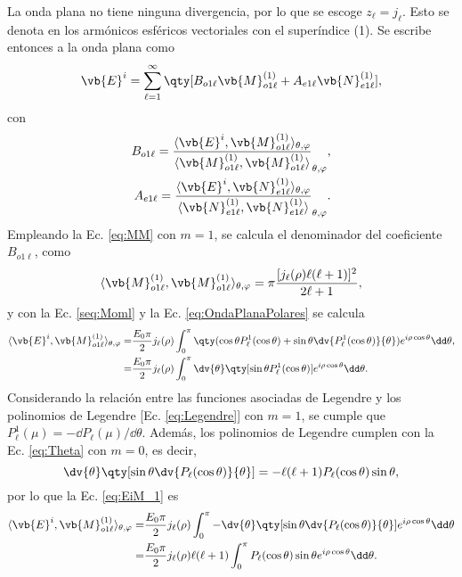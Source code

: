La onda plana no tiene ninguna divergencia, por lo que se escoge $z_\ell = j_\ell$. Esto se denota en los armónicos esféricos vectoriales con el superíndice (1). Se escribe entonces a la onda plana como
	\begin{equation}
	\vb{E}^i = \sum_{\ell=1}^\infty \qty[B_{o1\ell}\vb{M}_{o1\ell}^{(1)} + A_{e1\ell}\vb{N}_{e1\ell}^{(1)}],
	\end{equation}
con
%
	\begin{align}
	B_{o1\ell} = \frac{\langle \vb{E}^i, \vb{M}_{o1\ell}^{(1)}  \rangle_{\theta,\varphi}}
						{\langle \vb{M}_{o1\ell}^{(1)} ,\vb{M}_{o1\ell}^{(1)} \rangle}_{\theta,\varphi},\notag\\
	A_{e1\ell} = \frac{\langle \vb{E}^i, \vb{N}_{e1\ell}^{(1)} \rangle_{\theta,\varphi}}
						{\langle \vb{N}_{e1\ell}^{(1)},\vb{N}_{e1\ell}^{(1)} \rangle}_{\theta,\varphi}						.
	\end{align}
%
Empleando la Ec. \eqref{eq:MM} con $m=1$, se calcula el denominador del coeficiente $B_{o1\ell}$, como
	\begin{equation}
			\langle \vb{M}_{o1\ell}^{(1)} ,\vb{M}_{o1\ell}^{(1)} \rangle_{\theta,\varphi} = \pi \frac{[j_\ell(\rho) \ell(\ell+1)]^2}{2\ell+1},
			\label{eq:MMm=1}
	\end{equation}
y con la Ec. \eqref{seq:Moml} y la Ec. \eqref{eq:OndaPlanaPolares} se calcula
	\begin{align}
		\langle \vb{E}^i, \vb{M}_{o1\ell}^{(1)}  \rangle_{\theta,\varphi} 
			=& \frac{E_0 \pi}{2} j_\ell(\rho) \int_0^\pi \qty(\cos\theta P_\ell^1(\cos\theta)+\sin\theta \dv{P_\ell^1(\cos\theta)}{\theta})e^{i\rho\cos\theta}\dd\theta,\notag\\
			=& \frac{E_0 \pi}{2} j_\ell(\rho) \int_0^\pi \dv{\theta}\qty[\sin\theta P_\ell^1(\cos\theta)]e^{i\rho\cos\theta}\dd\theta. \label{eq:EiM_1}
	\end{align}
Considerando la relación entre las funciones asociadas de Legendre y los polinomios de Legendre [Ec. \eqref{eq:Legendre}] con $m=1$, se cumple que $P_\ell^1(\mu)=-\dd P_\ell(\mu)/\dd\theta$. Además, los polinomios de Legendre cumplen con la Ec. \eqref{eq:Theta} con $m=0$, es decir,
	\begin{equation*}
	\dv{\theta}\qty[\sin\theta \dv{P_\ell(\cos\theta)}{\theta}] = - \ell(\ell+1)P_\ell(\cos\theta) \sin\theta,
	\end{equation*}
por lo que la Ec. \eqref{eq:EiM_1} es
	\begin{align}
	\langle \vb{E}^i, \vb{M}_{o1\ell}^{(1)}  \rangle_{\theta,\varphi}
			 = & \frac{E_0 \pi}{2} j_\ell(\rho) \int_0^\pi -\dv{\theta}\qty[\sin\theta \dv{P_\ell(\cos\theta)}{\theta}]e^{i\rho\cos\theta}\dd\theta\notag\\
			  = & \frac{E_0 \pi}{2} j_\ell(\rho) \ell(\ell+1)\int_0^\pi P_\ell(\cos\theta)\sin\theta e^{i\rho\cos\theta}\dd\theta.\label{eq:EiM_2}
	\end{align}
